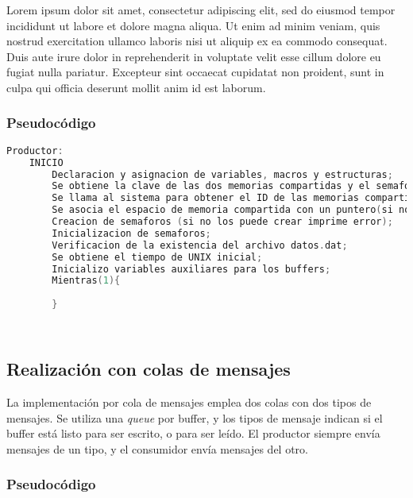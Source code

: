 Lorem ipsum dolor sit amet, consectetur adipiscing elit, sed do eiusmod tempor incididunt ut labore et dolore magna aliqua. Ut enim ad minim veniam, quis nostrud exercitation ullamco laboris nisi ut aliquip ex ea commodo consequat. Duis aute irure dolor in reprehenderit in voluptate velit esse cillum dolore eu fugiat nulla pariatur. Excepteur sint occaecat cupidatat non proident, sunt in culpa qui officia deserunt mollit anim id est laborum.\\

\subsubsection{Pseudocódigo}

\begin{lstlisting}[language=C]          % No usar tildes en el pseudocódigo
    Productor:
    INICIO
        Declaracion y asignacion de variables, macros y estructuras;
        Se obtiene la clave de las dos memorias compartidas y el semaforo (en el caso de que no las obtenga imprime error);
        Se llama al sistema para obtener el ID de las memorias compartidas (en el caso de que no las obtenga imprime error);
        Se asocia el espacio de memoria compartida con un puntero(si no puede asociar imprime error);
        Creacion de semaforos (si no los puede crear imprime error);
        Inicializacion de semaforos;
        Verificacion de la existencia del archivo datos.dat;
        Se obtiene el tiempo de UNIX inicial;
        Inicializo variables auxiliares para los buffers;
        Mientras(1){
        
        }
    
    
\end{lstlisting}

\subsection{Realización con colas de mensajes}

La implementación por cola de mensajes emplea dos colas con dos tipos de mensajes. Se utiliza una \textit{queue} por buffer, y los tipos de mensaje indican si el buffer está listo para ser escrito, o para ser leído. El productor siempre envía mensajes de un tipo, y el consumidor envía mensajes del otro.

\subsubsection{Pseudocódigo}

